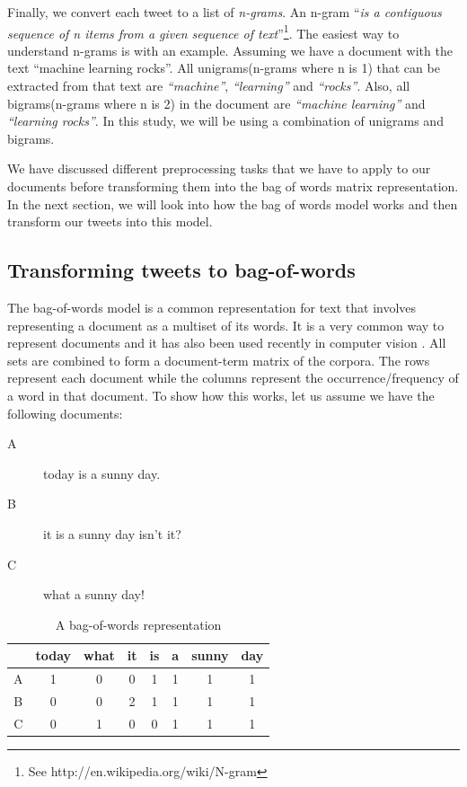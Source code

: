 
Finally, we convert each tweet to a list of \textit{n-grams}. An n-gram ``\textit{is a contiguous
sequence of n items from a given sequence of text}''\footnote{See
http://en.wikipedia.org/wiki/N-gram}. The easiest way to understand n-grams is with an example.
Assuming we have a document with the text ``machine learning rocks''. All unigrams(n-grams
where n is 1) that can be extracted from that text are \textit{``machine''}, \textit{``learning''}
and \textit{``rocks''}. Also, all bigrams(n-grams where n is 2) in the document are
\textit{``machine learning''} and \textit{``learning rocks''}. In this study, we will be using a
combination of unigrams and bigrams.

We have discussed different preprocessing tasks that we have to apply to our documents before
transforming them into the bag of words matrix representation. In the next section, we will look
into how the bag of words model works and then transform our tweets into this model.


\subsection{Transforming tweets to bag-of-words}
The bag-of-words model is a common representation for text that involves representing a document as
a multiset of its words. It is a very common way to represent documents and it has also been used
recently in computer vision \citep{sivic2009efficient}. All sets are combined to form a
document-term matrix of the corpora. The rows represent each document while the columns represent
the occurrence/frequency of a word in that document. To show how this works, let us assume we have
the following documents:
\begin{description}
  \item[A] today is a sunny day.
  \item[B] it is a sunny day isn't it?
  \item[C] what a sunny day!
\end{description}

\begin{table}
  \begin{center}
    \begin{tabular}{|c|c c c c c c c|}
      \hline
      & today & what & it & is & a & sunny & day \\
      \hline
      A & 1 & 0 & 0 & 1 & 1 & 1 & 1 \\
      B & 0 & 0 & 2 & 1 & 1 & 1 & 1 \\
      C & 0 & 1 & 0 & 0 & 1 & 1 & 1 \\
      \hline
    \end{tabular}
    \caption{A bag-of-words representation}
    \label{tab:document-term-matrix}
  \end{center}
\end{table}


